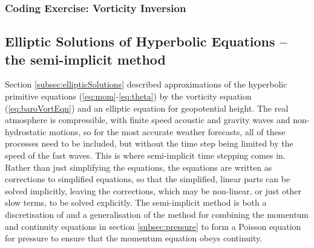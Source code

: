 \subsubsection{Coding Exercise: Vorticity Inversion}


\subsection{Elliptic Solutions of Hyperbolic Equations -- the semi-implicit
method}\label{subsec:SI}

Section \ref{subsec:ellipticSolutions} described approximations of
the hyperbolic primitive equations (\ref{eq:mom}-\ref{eq:theta})
by the vorticity equation (\ref{eq:baroVortEqn}) and an elliptic
equation for geopotential height. The real atmosphere is compressible,
with finite speed acoustic and gravity waves and non-hydrostatic motions,
so for the most accurate weather forecasts, all of these processes
need to be included, but without the time step being limited by the
speed of the fast waves. This is where semi-implicit time stepping
comes in. Rather than just simplifying the equations, the equations
are written as corrections to simplified equations, so that the simplified,
linear parts can be solved implicitly, leaving the corrections, which
may be non-linear, or just other slow terms, to be solved explicitly.
The semi-implicit method is both a discretisation of and a generalisation of the method for combining the momentum and continuity equations in section \ref{subsec:pressure} to form a Poisson equation for pressure to ensure that the momentum equation obeys continuity.

